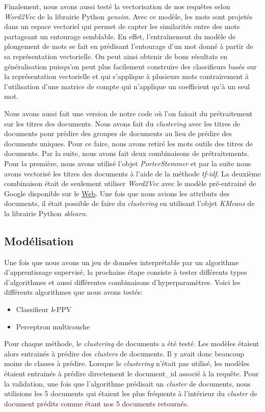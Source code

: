 Finalement, nous avons aussi testé la vectorisation de nos requêtes selon \textit{Word2Vec} de la librairie Python \textit{gensim}.
Avec ce modèle, les mots sont projetés dans un espace vectoriel qui permet de capter les similarités entre des mots partageant un entourage semblable. En effet, l'entraînement du modèle de plongement de mots se fait en prédisant l'entourage d'un mot donné à partir de sa représentation vectorielle. On peut ainsi obtenir de bons résultats en généralisation puisqu'on peut plus facilement construire des classifieurs basés sur la représentation vectorielle et qui s'applique à plusieurs mots contrairement à l'utilisation d'une matrice de compte qui n'applique un coefficient qu'à un seul mot.

Nous avons aussi fait une version de notre code où l'on faisait du prétraitement sur les titres des documents. Nous avons fait du \textit{clustering} avec les titres de documents pour prédire des groupes de documents au lieu de prédire des documents uniques. Pour ce faire, nous avons retiré les mots outils des titres de documents. Par la suite, nous avons fait deux combinaisons de prétraitements. Pour la première, nous avons utilisé l'objet \textit{PorterStemmer} et par la suite nous avons vectorisé les titres des documents à l'aide de la méthode \textit{tf-idf}. La deuxième combinaison était de seulement utiliser \textit{Word2Vec} avec le modèle pré-entrainé de Google disponible sur le \href{https://code.google.com/archive/p/word2vec/}{Web}. Une fois que nous avions les attributs des documents, il était possible de faire du \textit{clustering} en utilisant l'objet \textit{KMeans} de la librairie Python \textit{sklearn}. 

\subsection{Modélisation}

Une fois que nous avons un jeu de données interprétable par un algorithme d'apprentissage supervisé, la prochaine étape consiste à tester différents types d'algorithmes et aussi différentes combinaisons d'hyperparamètres. Voici les différents algorithmes que nous avons testés:

\begin{itemize}
  \item Classifieur \textit{k}-PPV
  \item Perceptron multicouche
\end{itemize}

Pour chaque méthode, le \textit{clustering} de documents a été testé. Les modèles étaient alors entrainés à prédire des \textit{clusters} de documents. Il y avait donc beaucoup moins de classes à prédire. Lorsque le \textit{clustering} n'était pas utilisé, les modèles étaient entrainés à prédire directement le document\_id associé à la requête. Pour la validation, une fois que l'algorithme prédisait un \textit{cluster} de documents, nous utilisions les 5 documents qui étaient les plus fréquents à l'intérieur du \textit{cluster} de document prédits comme étant nos 5 documents retournés.

